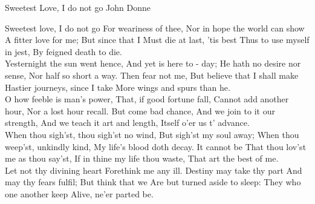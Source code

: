 \begin{poem}
{Sweetest Love, I do not go}
{John Donne}
 
Sweetest love, I do not go 
For weariness of thee, 
Nor in hope the world can show 
A fitter love for me; 
But since that I 
Must die at last, 'tis best 
Thus to use myself in jest, 
By feigned death to die.\\

Yesternight the sun went hence, 
And yet is here to - day; 
He hath no desire nor sense, 
Nor half so short a way. 
Then fear not me, 
But believe that I shall make 
Hastier journeys, since I take 
More wings and spurs than he.\\

O how feeble is man's power, 
That, if good fortune fall, 
Cannot add another hour, 
Nor a lost hour recall. 
But come bad chance, 
And we join to it our strength, 
And we teach it art and length, 
Itself o'er us t' advance.\\

When thou sigh'st, thou sigh'st no wind, 
But sigh'st my soul away; 
When thou weep'st, unkindly kind, 
My life's blood doth decay. 
It cannot be 
That thou lov'st me as thou say'st, 
If in thine my life thou waste, 
That art the best of me.\\

Let not thy divining heart 
Forethink me any ill. 
Destiny may take thy part 
And may thy fears fulfil; 
But think that we 
Are but turned aside to sleep: 
They who one another keep 
Alive, ne'er parted be.\\
\end{poem}

